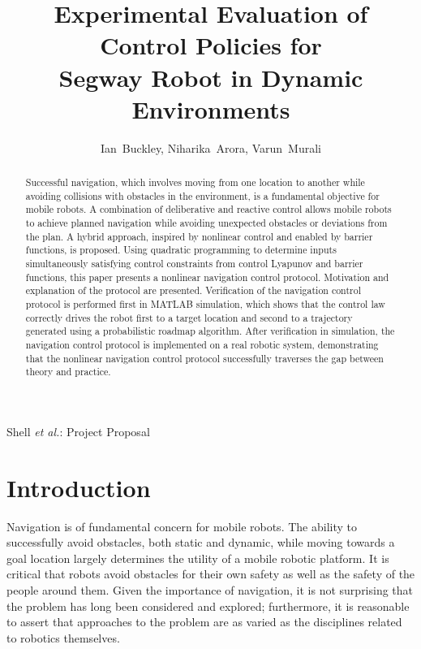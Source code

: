 \documentclass[journal]{IEEEtran}
\begin{document}
\title{Experimental Evaluation of Control Policies for \\Segway Robot in Dynamic Environments }
\author{Ian~Buckley, Niharika~Arora, Varun~Murali}
{Shell \MakeLowercase{\textit{et al.}}: Project Proposal}
\maketitle

\begin{abstract}
Successful navigation, which involves moving from one location to another while avoiding collisions with obstacles in the environment, is a fundamental objective for mobile robots. A combination of deliberative and reactive control allows mobile robots to achieve planned navigation while avoiding unexpected obstacles or deviations from the plan. A hybrid approach, inspired by nonlinear control and enabled by barrier functions, is proposed. Using quadratic programming to determine inputs simultaneously satisfying control constraints from control Lyapunov and barrier functions, this paper presents a nonlinear navigation control protocol. Motivation and explanation of the protocol are presented. Verification of the navigation control protocol is performed first in MATLAB simulation, which shows that the control law correctly drives the robot first to a target location and second to a trajectory generated using a probabilistic roadmap algorithm. After verification in simulation, the navigation control protocol is implemented on a real robotic system, demonstrating that the nonlinear navigation control protocol successfully traverses the gap between theory and practice. 
\end{abstract}

\section{Introduction}
Navigation is of fundamental concern for mobile robots. The ability to successfully avoid obstacles, both static and dynamic, while moving towards a goal location largely determines the utility of a mobile robotic platform. It is critical that robots avoid obstacles for their own safety as well as the safety of the people around them. Given the importance of navigation, it is not surprising that the problem has long been considered and explored; furthermore, it is reasonable to assert that approaches to the problem are as varied as the disciplines related to robotics themselves.  
\end{document}
